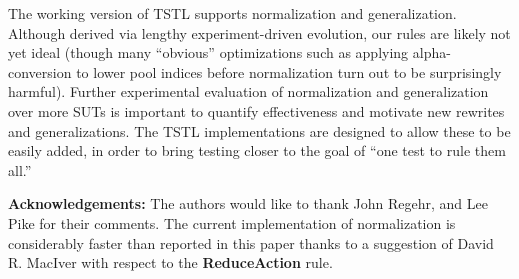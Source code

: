 The working version of  TSTL \cite{tstl} supports
normalization and generalization.  Although derived via lengthy experiment-driven
evolution, our rules are likely not yet ideal (though many ``obvious''
optimizations such as applying alpha-conversion to lower pool indices
before normalization turn out to be surprisingly harmful).   Further experimental
evaluation of normalization and generalization over more SUTs is
important to quantify effectiveness and motivate new rewrites and
generalizations.  The TSTL implementations are designed to allow these
to be easily added, in order to bring testing closer to the
goal of ``one test to rule them all.''


{\scriptsize {\bf Acknowledgements:} The authors would like to thank
  John Regehr, and Lee Pike for their comments.  The current implementation of
  normalization is considerably faster than reported in
  this paper thanks to a suggestion of David R. MacIver with respect
  to the {\bf ReduceAction} rule.
}